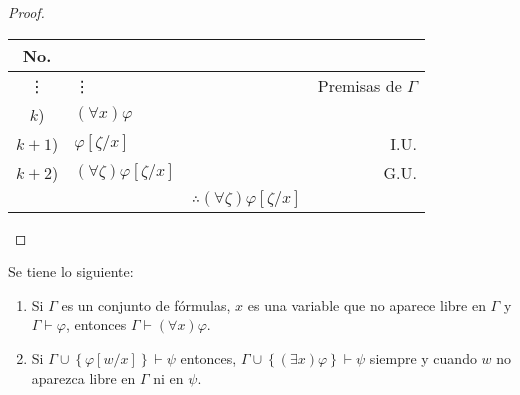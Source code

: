 \documentclass[12pt]{report}
\newcounter{it}
\theoremstyle{largebreak}
\begin{document}
    \begin{proof}
        \begin{center}
            \begin{tabular}{ c  l  l  r  }
                \hline
                No. &  &  &  \\
                \hline
                \vdots & \vdots  &  & Premisas de $\Gamma$  \\
                $k$) & $(\forall x)\varphi$ &  &  \\
                $k+1$) & $\varphi[\zeta/x]$ &  & I.U. \\
                $k+2$) & $(\forall\zeta)\varphi[\zeta/x]$ &  & G.U. \\
                \hline
                  &  &  $\therefore(\forall\zeta)\varphi[\zeta/x]$ &  \\
            \end{tabular}
        \end{center}
    \end{proof}

    \begin{theor}[Metateorema]
        Se tiene lo siguiente:
        \begin{enumerate}
            \item Si $\Gamma$ es un conjunto de fórmulas, $x$ es una variable que no aparece libre en $\Gamma$ y $\Gamma\vdash\varphi$, entonces $\Gamma\vdash(\forall x)\varphi$.
            \item Si $\Gamma\cup\left\{\varphi[w/x] \right\}\vdash\psi$ entonces, $\Gamma\cup\left\{(\exists x)\varphi \right\}\vdash\psi$ siempre y cuando $w$ no aparezca libre en $\Gamma$ ni en $\psi$.
        \end{enumerate}        
    \end{theor}
\end{document}
